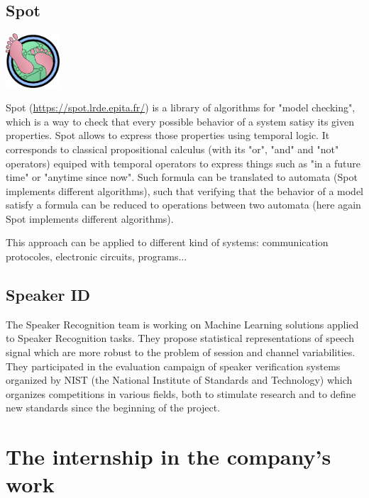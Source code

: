\subsection{Spot}
\begin{center}
 \includegraphics[width=2cm]{img/spot.png}
\end{center}
Spot (\url{https://spot.lrde.epita.fr/}) is a library of algorithms for "model checking",
which is a way to check that every possible behavior of a system satisy its given properties.
Spot allows to express those properties using temporal logic. It corresponds to classical propositional
calculus (with its "or", "and" and "not" operators) equiped with temporal operators to express things
such as "in a future time" or "anytime since now". Such formula can be translated to automata
(Spot implements different algorithms), such that verifying that the behavior of a model satisfy a
formula can be reduced to operations between two automata (here again Spot implements different
algorithms).

This approach can be applied to different kind of systems: communication protocoles,
electronic circuits, programs...


\subsection{Speaker ID}
The Speaker Recognition team is working on Machine Learning solutions applied to Speaker Recognition
tasks. They propose statistical representations of speech signal which are more robust to the problem
of session and channel variabilities. They participated in the evaluation campaign of speaker
verification systems organized by NIST (the National Institute of Standards and Technology) which
organizes competitions in various fields, both to stimulate research and to define new standards since
the beginning of the project.


\section{The internship in the company's work}